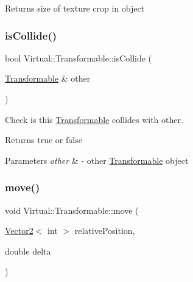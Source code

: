 \begin{DoxyReturn}{Returns}
size of texture crop in object 
\end{DoxyReturn}
\hypertarget{class_virtual_1_1_transformable_aae527eac3aa7053455e9064373592b21}{}\label{class_virtual_1_1_transformable_aae527eac3aa7053455e9064373592b21} 
\subsubsection{\texorpdfstring{is\+Collide()}{isCollide()}}
{\footnotesize\ttfamily bool Virtual\+::\+Transformable\+::is\+Collide (\begin{DoxyParamCaption}\item[{\hyperlink{class_virtual_1_1_transformable}{Transformable} \&}]{other }\end{DoxyParamCaption})}



Check is this \hyperlink{class_virtual_1_1_transformable}{Transformable} collides with other. 

\begin{DoxyReturn}{Returns}
true or false
\end{DoxyReturn}

\begin{DoxyParams}{Parameters}
{\em other} & -\/ other \hyperlink{class_virtual_1_1_transformable}{Transformable} object \\
\hline
\end{DoxyParams}
\hypertarget{class_virtual_1_1_transformable_a80eb3848090682f3ad3bd3faf879f6ab}{}\label{class_virtual_1_1_transformable_a80eb3848090682f3ad3bd3faf879f6ab} 
\subsubsection{\texorpdfstring{move()}{move()}}
{\footnotesize\ttfamily void Virtual\+::\+Transformable\+::move (\begin{DoxyParamCaption}\item[{\hyperlink{struct_virtual_1_1_vector2}{Vector2}$<$ int $>$}]{relative\+Position,  }\item[{double}]{delta }\end{DoxyParamCaption})}



